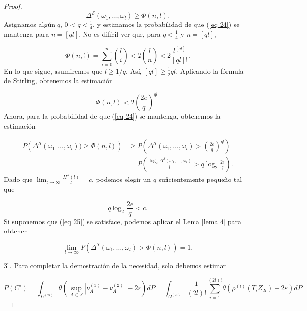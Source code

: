 \documentclass{report}
\begin{document}
\begin{proof}
\begin{equation}\label{eq 24}
\Delta^{\mathcal{S}}(\omega_1, \dots, \omega_l) \geq \Phi(n, l).
\end{equation}
Asignamos algún \( q \), \( 0 < q < \frac{1}{4} \), y estimamos la probabilidad de que (\ref{eq 24}) se mantenga para \( n = [ ql ] \). No es difícil ver que, para \( q < \frac{1}{4} \) y \( n = [ ql ] \),

\begin{equation*}
\Phi(n, l) = \sum_{i=0}^{n} \binom{l}{i} < 2 \binom{l}{n} < 2 \frac{l^{[ ql ]}}{[ ql ] !}.
\end{equation*}
En lo que sigue, asumiremos que \( l \geq 1/q \). Así, \( [ ql ] \geq \frac{1}{2} ql \). Aplicando la fórmula de Stirling, obtenemos la estimación

\begin{equation*}
\Phi(n, l) < 2 \left( \frac{2e}{q} \right)^{ql}.
\end{equation*}
Ahora, para la probabilidad de que (\ref{eq 24}) se mantenga, obtenemos la estimación

\begin{align*}
P \left( \Delta^{\mathcal{S}}(\omega_1, \dots, \omega_l))  \geq  \Phi(n, l) \right) 
&\geq P \left( \Delta^{\mathcal{S}}(\omega_1, \dots, \omega_l) > \left( \frac{2e}{q} \right)^{ql} \right) \\
&= P \left( \frac{\log_2 \Delta^{\mathcal{S}}(\omega_1, \dots, \omega_l)}{l} > q \log_2 \frac{2e}{q} \right).
\end{align*}
Dado que \( \lim_{l \to \infty} \frac{H^{\mathcal{S}}(l)}{l} = c \), podemos elegir un \( q \) suficientemente pequeño tal que

\begin{equation}\label{eq 25}
q \log_2 \frac{2e}{q} < c.
\end{equation}
Si suponemos que (\ref{eq 25}) se satisface, podemos aplicar el Lema \ref{lema 4} para obtener

\begin{equation}\label{eq 26}
\lim_{l \to \infty} P \left( \Delta^{\mathcal{S}}(\omega_1, \dots, \omega_l) > \Phi(n, l) \right) = 1.
\end{equation}

\bigskip

\( 3^\circ \). Para completar la demostración de la necesidad, solo debemos estimar

\begin{equation*}
P(C') = \int_{\Omega^{(2l)}} \theta \left( \sup_{A \in \mathcal{S}} | \nu_A^{(1)} - \nu_A^{(2)} | - 2\varepsilon \right) dP
= \int_{\Omega^{(2l)}} \frac{1}{(2l)!} \sum_{i=1}^{(2l)!} \theta \left( \rho^{(l)} (T_i Z_{2l}) - 2\varepsilon \right) dP
\end{equation*}


\end{proof}
\end{document}
